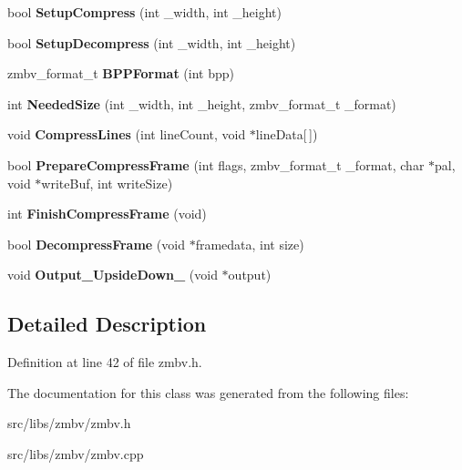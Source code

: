 \begin{DoxyCompactItemize}
\item 
\hypertarget{classVideoCodec_aea87b8fb5fb035c778638d88216831f9}{bool {\bfseries Setup\-Compress} (int \-\_\-width, int \-\_\-height)}\label{classVideoCodec_aea87b8fb5fb035c778638d88216831f9}

\item 
\hypertarget{classVideoCodec_abf15ef56d08da5ae564aff193e0b2c65}{bool {\bfseries Setup\-Decompress} (int \-\_\-width, int \-\_\-height)}\label{classVideoCodec_abf15ef56d08da5ae564aff193e0b2c65}

\item 
\hypertarget{classVideoCodec_aab1d0e5cf95793ebc9c8af205c07e63c}{zmbv\-\_\-format\-\_\-t {\bfseries B\-P\-P\-Format} (int bpp)}\label{classVideoCodec_aab1d0e5cf95793ebc9c8af205c07e63c}

\item 
\hypertarget{classVideoCodec_a893b6f9eb36852d594fad4e1cb2bc811}{int {\bfseries Needed\-Size} (int \-\_\-width, int \-\_\-height, zmbv\-\_\-format\-\_\-t \-\_\-format)}\label{classVideoCodec_a893b6f9eb36852d594fad4e1cb2bc811}

\item 
\hypertarget{classVideoCodec_ae3dedde4914fab6db8fede1e8178db0d}{void {\bfseries Compress\-Lines} (int line\-Count, void $\ast$line\-Data\mbox{[}$\,$\mbox{]})}\label{classVideoCodec_ae3dedde4914fab6db8fede1e8178db0d}

\item 
\hypertarget{classVideoCodec_a5336800755372baf360017edf4d68548}{bool {\bfseries Prepare\-Compress\-Frame} (int flags, zmbv\-\_\-format\-\_\-t \-\_\-format, char $\ast$pal, void $\ast$write\-Buf, int write\-Size)}\label{classVideoCodec_a5336800755372baf360017edf4d68548}

\item 
\hypertarget{classVideoCodec_a7c82b7a80b527a623468da05f07b6873}{int {\bfseries Finish\-Compress\-Frame} (void)}\label{classVideoCodec_a7c82b7a80b527a623468da05f07b6873}

\item 
\hypertarget{classVideoCodec_a38561ab71d5dff2189073e3747319733}{bool {\bfseries Decompress\-Frame} (void $\ast$framedata, int size)}\label{classVideoCodec_a38561ab71d5dff2189073e3747319733}

\item 
\hypertarget{classVideoCodec_a3f29d31386be5442834b08de67454669}{void {\bfseries Output\-\_\-\-Upside\-Down\-\_} (void $\ast$output)}\label{classVideoCodec_a3f29d31386be5442834b08de67454669}

\end{DoxyCompactItemize}


\subsection{Detailed Description}


Definition at line 42 of file zmbv.\-h.



The documentation for this class was generated from the following files\-:\begin{DoxyCompactItemize}
\item 
src/libs/zmbv/zmbv.\-h\item 
src/libs/zmbv/zmbv.\-cpp\end{DoxyCompactItemize}
